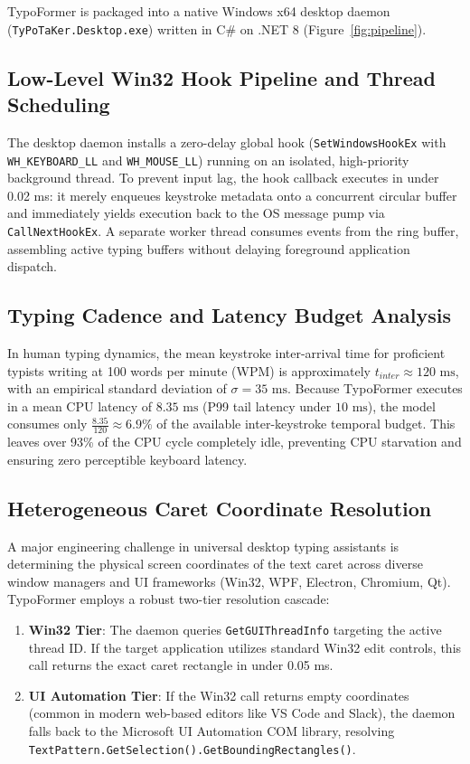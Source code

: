 \documentclass[10pt,journal,compsoc]{IEEEtran}
\begin{document}
TypoFormer is packaged into a native Windows x64 desktop daemon (\texttt{TyPoTaKer.Desktop.exe}) written in C\# on .NET 8 (Figure~\ref{fig:pipeline}).

\subsection{Low-Level Win32 Hook Pipeline and Thread Scheduling}
The desktop daemon installs a zero-delay global hook (\texttt{SetWindowsHookEx} with \texttt{WH\_KEYBOARD\_LL} and \texttt{WH\_MOUSE\_LL}) running on an isolated, high-priority background thread. To prevent input lag, the hook callback executes in under 0.02 ms: it merely enqueues keystroke metadata onto a concurrent circular buffer and immediately yields execution back to the OS message pump via \texttt{CallNextHookEx}. A separate worker thread consumes events from the ring buffer, assembling active typing buffers without delaying foreground application dispatch.

\subsection{Typing Cadence and Latency Budget Analysis}
In human typing dynamics, the mean keystroke inter-arrival time for proficient typists writing at 100 words per minute (WPM) is approximately $t_{inter} \approx 120\text{ ms}$, with an empirical standard deviation of $\sigma = 35\text{ ms}$. Because TypoFormer executes in a mean CPU latency of $8.35\text{ ms}$ (P99 tail latency under $10\text{ ms}$), the model consumes only $\frac{8.35}{120} \approx 6.9\%$ of the available inter-keystroke temporal budget. This leaves over 93\% of the CPU cycle completely idle, preventing CPU starvation and ensuring zero perceptible keyboard latency.

\subsection{Heterogeneous Caret Coordinate Resolution}
A major engineering challenge in universal desktop typing assistants is determining the physical screen coordinates of the text caret across diverse window managers and UI frameworks (Win32, WPF, Electron, Chromium, Qt). TypoFormer employs a robust two-tier resolution cascade:
\begin{enumerate}
    \item \textbf{Win32 Tier}: The daemon queries \texttt{GetGUIThreadInfo} targeting the active thread ID. If the target application utilizes standard Win32 edit controls, this call returns the exact caret rectangle in under 0.05 ms.
    \item \textbf{UI Automation Tier}: If the Win32 call returns empty coordinates (common in modern web-based editors like VS Code and Slack), the daemon falls back to the Microsoft UI Automation COM library, resolving \texttt{TextPattern.GetSelection()}\allowbreak\texttt{.GetBoundingRectangles()}.
\end{enumerate}
\end{document}
